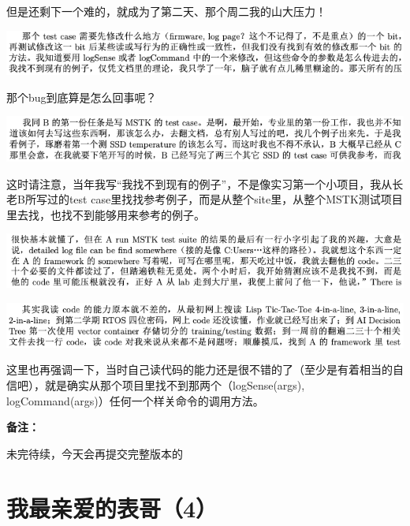\documentclass[9pt, b5paper]{article}
\begin{document}
但是还剩下一个难的，就成为了第二天、那个周二我的山大压力！

\begin{center}
\includegraphics[width=.9\linewidth]{./pic/backups_plans_20210507_114156.png}
\end{center}

那个bug到底算是怎么回事呢？

\begin{center}
\includegraphics[width=.9\linewidth]{./pic/backups_plans_20210507_114437.png}
\end{center}

这时请注意，当年我写“我找不到现有的例子”，不是像实习第一个小项目，我从长老B所写过的test case里找找参考例子，而是从整个site里，从整个MSTK测试项目里去找，也找不到能够用来参考的例子。 

\begin{center}
\includegraphics[width=.9\linewidth]{./pic/backups_plans_20210507_115308.png}
\end{center}

\begin{center}
\includegraphics[width=.9\linewidth]{./pic/backups_plans_20210507_115147.png}
\end{center}

这里也再强调一下，当时自己读代码的能力还是很不错的了（至少是有着相当的自信吧），就是确实从那个项目里找不到那两个（logSense(args), logCommand(args)）任何一个样关命令的调用方法。

\textbf{备注：}

未完待续，今天会再提交完整版本的

\section{我最亲爱的表哥（4）}
\label{sec:orgd561205}
\end{document}
